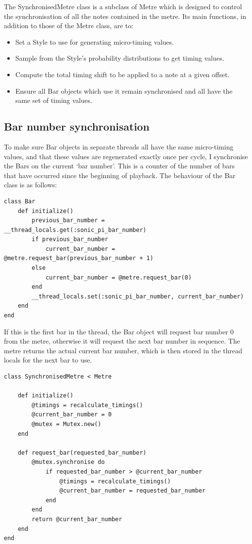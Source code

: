 \documentclass[12pt,twoside,openright]{report}
\begin{document}
The SynchronisedMetre class is a subclass of Metre which is designed to control
the synchronisation of all the notes contained in the metre. Its main functions,
in addition to those of the Metre class, are to:
\begin{itemize}
	\item Set a Style to use for generating micro-timing values.
	\item Sample from the Style's probability distributions to get timing values.
	\item Compute the total timing shift to be applied to a note at a given offset.
	\item Ensure all Bar objects which use it remain synchronised and all have the same set of timing values.
\end{itemize}


\subsection{Bar number synchronisation} \label{bar_number_synchronisation}

To make sure Bar objects in separate threads all have the same micro-timing
values, and that these values are regenerated exactly once per cycle, I
synchronise the Bars on the current `bar number'. This is a counter of the
number of bars that have occurred since the beginning of playback. The behaviour
of the Bar class is as follows:

\begin{verbatim}
class Bar
    def initialize()
        previous_bar_number = __thread_locals.get(:sonic_pi_bar_number)
        if previous_bar_number
            current_bar_number = @metre.request_bar(previous_bar_number + 1)
        else
            current_bar_number = @metre.request_bar(0)
        end
        __thread_locals.set(:sonic_pi_bar_number, current_bar_number)
    end
end
\end{verbatim}

If this is the first bar in the thread, the Bar object will request bar number 0
from the metre, otherwise it will request the next bar number in sequence. The
metre returns the actual current bar number, which is then stored in the thread
locals for the next bar to use.

\begin{verbatim}
class SynchronisedMetre < Metre

    def initialize()
        @timings = recalculate_timings()
        @current_bar_number = 0
        @mutex = Mutex.new()
    end

    def request_bar(requested_bar_number)
        @mutex.synchronise do
            if requested_bar_number > @current_bar_number
                @timings = recalculate_timings()
                @current_bar_number = requested_bar_number
            end
        end
        return @current_bar_number
    end
end
\end{verbatim}
\end{document}

